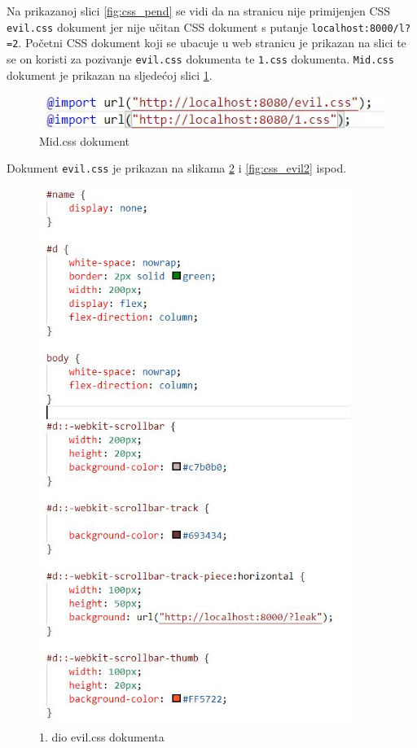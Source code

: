 \documentclass[12pt, oneside, onecolumn]{book}
\begin{document}
{Na prikazanoj slici \ref{fig:css_pend} se vidi da na stranicu nije primijenjen CSS \texttt{evil.css} dokument jer nije učitan CSS dokument s putanje \texttt{localhost:8000/l?=2}. Početni CSS dokument koji se ubacuje u web stranicu je prikazan na slici te se on koristi za pozivanje \texttt{evil.css} dokumenta te \texttt{1.css} dokumenta. \texttt{Mid.css} dokument je prikazan na sljedećoj slici \ref{fig:css_midc}. 

\begin{figure}[H]
	\begin{center}
		\includegraphics[width=\textwidth]{css_midc.jpg}
		\caption{Mid.css dokument} \label{fig:css_midc}
	\end{center}
\end{figure}

Dokument \texttt{evil.css} je prikazan na slikama \ref{fig:css_evil} i \ref{fig:css_evil2} ispod.

\begin{figure}[H]
	\begin{center}
		\includegraphics[width=0.9\textwidth]{css_evil.jpg}
		\caption{1. dio evil.css dokumenta} \label{fig:css_evil}
	\end{center}
\end{figure}

}
\end{document}
